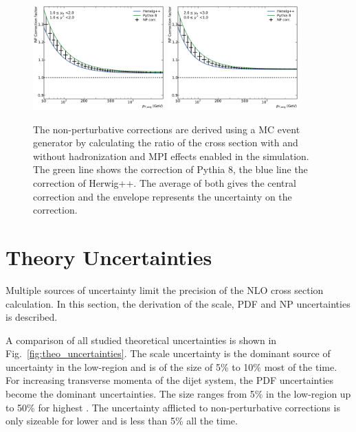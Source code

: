 \begin{figure}[htp]
    \includegraphics[width=0.45\textwidth]{figures/theory/np_factors_calc_yb1ys1.pdf}\hfill
    \includegraphics[width=0.45\textwidth]{figures/theory/np_factors_calc_yb2ys0.pdf}
    \caption[Non-perturbative Corrections]{The non-perturbative corrections are derived using a MC event
        generator by calculating the ratio of the cross section with and without
        hadronization and MPI effects enabled in the simulation. The green line
        shows the correction of Pythia 8, the blue line the correction of
    Herwig++. The average of both gives the central correction and the envelope
represents the uncertainty on the correction.}
    \label{fig:np_factors}
\end{figure}

\section{Theory Uncertainties}

Multiple sources of uncertainty limit the precision of the NLO cross section
calculation. In this section, the derivation of the scale, PDF and NP
uncertainties is described. 

A comparison of all studied theoretical uncertainties is shown in
Fig.~\ref{fig:theo_uncertainties}. The scale uncertainty is the dominant source
of uncertainty in the low-\pt region and is of the size of 5\% to 10\% most of
the time. For increasing transverse momenta of the dijet system, the PDF
uncertainties become the dominant uncertainties. The size ranges from 5\% in the
low-\pt region up to 50\% for highest \pt. The uncertainty afflicted to
non-perturbative corrections is only sizeable for lower \pt and is less than 5\%
all the time.

